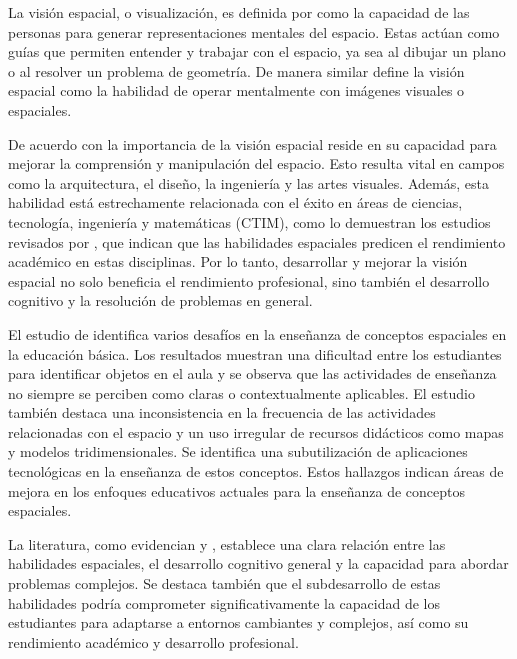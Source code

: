 
La visión espacial, o visualización, es definida por \citeauthor{piaget1971} \citeyear{piaget1971} como la capacidad de las personas para generar representaciones mentales del espacio. Estas actúan como guías que permiten entender y trabajar con el espacio, ya sea al dibujar un plano o al resolver un problema de geometría. De manera similar \citeauthor{sanjuan2016vision} \citeyear{sanjuan2016vision} define la visión espacial como la habilidad de operar mentalmente con imágenes visuales o espaciales.

De acuerdo con \citeauthor{wai2009spatial} \citeyear{wai2009spatial} la importancia de la visión espacial reside en su capacidad para mejorar la comprensión y manipulación del espacio. Esto resulta vital en campos como la arquitectura, el diseño, la ingeniería y las artes visuales. Además, esta habilidad está estrechamente relacionada con el éxito en áreas de ciencias, tecnología, ingeniería y matemáticas (CTIM), como lo demuestran los estudios revisados por \citeauthor{wai2009spatial} \citeyear{wai2009spatial}, que indican que las habilidades espaciales predicen el rendimiento académico en estas disciplinas. Por lo tanto, desarrollar y mejorar la visión espacial no solo beneficia el rendimiento profesional, sino también el desarrollo cognitivo y la resolución de problemas en general.

El estudio de \citeauthor{ramos2025ensenanza} \citeyear{ramos2025ensenanza} identifica varios desafíos en la enseñanza de conceptos espaciales en la educación básica. Los resultados muestran una dificultad entre los estudiantes para identificar objetos en el aula y se observa que las actividades de enseñanza no siempre se perciben como claras o contextualmente aplicables. El estudio también destaca una inconsistencia en la frecuencia de las actividades relacionadas con el espacio y un uso irregular de recursos didácticos como mapas y modelos tridimensionales. Se identifica una subutilización de aplicaciones tecnológicas en la enseñanza de estos conceptos. Estos hallazgos indican áreas de mejora en los enfoques educativos actuales para la enseñanza de conceptos espaciales.

La literatura, como evidencian \citeauthor{gunderson2012relation} \citeyear{gunderson2012relation} y \citeauthor{hawes2020explains} \citeyear{hawes2020explains}, establece una clara relación entre las habilidades espaciales, el desarrollo cognitivo general y la capacidad para abordar problemas complejos. Se destaca también que el subdesarrollo de estas habilidades podría comprometer significativamente la capacidad de los estudiantes para adaptarse a entornos cambiantes y complejos, así como su rendimiento académico y desarrollo profesional.

